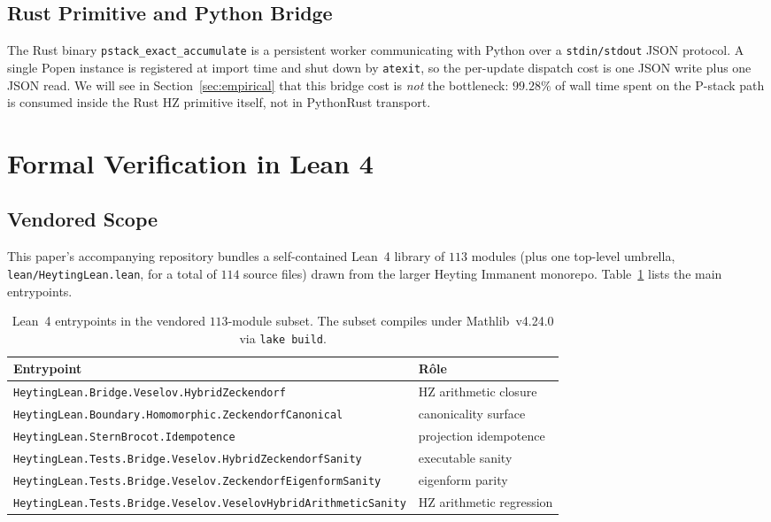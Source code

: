 \documentclass[11pt,a4paper]{article}
\begin{document}
\subsection{Rust Primitive and Python Bridge}

The Rust binary \texttt{pstack\_exact\_accumulate} is a persistent worker
communicating with Python over a \texttt{stdin/stdout} JSON protocol. A
single Popen instance is registered at import time and shut down by
\texttt{atexit}, so the per-update dispatch cost is one JSON write plus
one JSON read. We will see in Section~\ref{sec:empirical} that this
bridge cost is \emph{not} the bottleneck: $99.28\%$ of wall time spent on
the P-stack path is consumed inside the Rust HZ primitive itself, not in
Python\textendash Rust transport.

\section{Formal Verification in Lean 4}
\label{sec:lean}

\subsection{Vendored Scope}

This paper's accompanying repository bundles a self-contained Lean~4
library of $113$ modules (plus one top-level umbrella,
\texttt{lean/HeytingLean.lean}, for a total of $114$ source files)
drawn from the larger Heyting Immanent monorepo.
Table~\ref{tab:lean_scope} lists the main entrypoints.

\begin{table}[t]
\centering
\begin{tabular}{ll}
\toprule
Entrypoint & Rôle \\
\midrule
\texttt{HeytingLean.Bridge.Veselov.HybridZeckendorf} & HZ arithmetic closure \\
\texttt{HeytingLean.Boundary.Homomorphic.ZeckendorfCanonical} & canonicality surface \\
\texttt{HeytingLean.SternBrocot.Idempotence} & projection idempotence \\
\texttt{HeytingLean.Tests.Bridge.Veselov.HybridZeckendorfSanity} & executable sanity \\
\texttt{HeytingLean.Tests.Bridge.Veselov.ZeckendorfEigenformSanity} & eigenform parity \\
\texttt{HeytingLean.Tests.Bridge.Veselov.VeselovHybridArithmeticSanity} & HZ arithmetic regression \\
\bottomrule
\end{tabular}
\caption{Lean~4 entrypoints in the vendored $113$-module subset. The
subset compiles under Mathlib~v4.24.0 via \texttt{lake build}.}
\label{tab:lean_scope}
\end{table}
\end{document}
